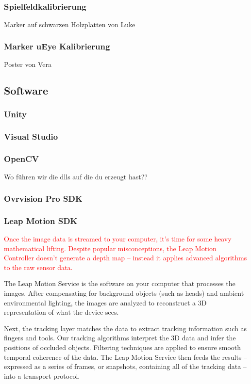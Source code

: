 \subsubsection{Spielfeldkalibrierung}
Marker auf schwarzen Holzplatten von Luke

\subsubsection{Marker uEye Kalibrierung}
Poster von Vera

\subsection{Software}
\subsubsection{Unity \label{unity}} 
\subsubsection{Visual Studio} 
\subsubsection{OpenCV} 
Wo führen wir die dlls auf die du erzeugt hast??
\subsubsection{Ovrvision Pro SDK} 
\subsubsection{Leap Motion SDK} 
\textcolor{red}{
Once the image data is streamed to your computer, it’s time for some heavy mathematical lifting. Despite popular misconceptions, the Leap Motion Controller doesn’t generate a depth map – instead it applies advanced algorithms to the raw sensor data.}

The Leap Motion Service is the software on your computer that processes the images. After compensating for background objects (such as heads) and ambient environmental lighting, the images are analyzed to reconstruct a 3D representation of what the device sees.

Next, the tracking layer matches the data to extract tracking information such as fingers and tools. Our tracking algorithms interpret the 3D data and infer the positions of occluded objects. Filtering techniques are applied to ensure smooth temporal coherence of the data. The Leap Motion Service then feeds the results – expressed as a series of frames, or snapshots, containing all of the tracking data – into a transport protocol.

